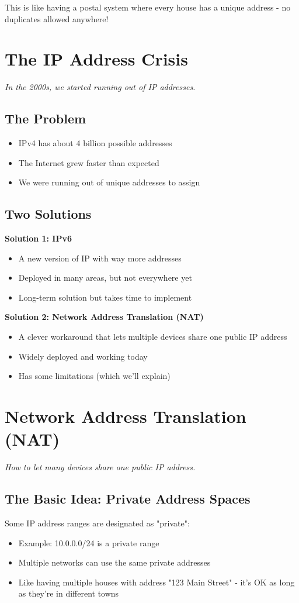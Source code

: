 \documentclass[../../compsys.tex]{subfiles}
\begin{document}
This is like having a postal system where every house has a unique address - no duplicates allowed anywhere!


\section{The IP Address Crisis}
\textit{In the 2000s, we started running out of IP addresses.}

\subsection{The Problem}
\begin{itemize}
    \item IPv4 has about 4 billion possible addresses
    \item The Internet grew faster than expected
    \item We were running out of unique addresses to assign
\end{itemize}

\subsection{Two Solutions}
\textbf{Solution 1: IPv6}
\begin{itemize}
    \item A new version of IP with way more addresses
    \item Deployed in many areas, but not everywhere yet
    \item Long-term solution but takes time to implement
\end{itemize}

\textbf{Solution 2: Network Address Translation (NAT)}
\begin{itemize}
    \item A clever workaround that lets multiple devices share one public IP address
    \item Widely deployed and working today
    \item Has some limitations (which we'll explain)
\end{itemize}

\section{Network Address Translation (NAT)}
\textit{How to let many devices share one public IP address.}

\subsection{The Basic Idea: Private Address Spaces}
Some IP address ranges are designated as "private":
\begin{itemize}
    \item Example: 10.0.0.0/24 is a private range
    \item Multiple networks can use the same private addresses
    \item Like having multiple houses with address "123 Main Street" - it's OK as long as they're in different towns
\end{itemize}
\end{document}
